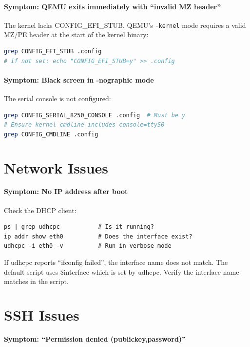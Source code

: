 \paragraph{Symptom: QEMU exits immediately with ``invalid MZ header''}

The kernel lacks CONFIG\_EFI\_STUB. QEMU's \texttt{-kernel} mode requires
a valid MZ/PE header at the start of the kernel binary:

\begin{lstlisting}[language=bash]
grep CONFIG_EFI_STUB .config
# If not set: echo "CONFIG_EFI_STUB=y" >> .config
\end{lstlisting}

\paragraph{Symptom: Black screen in -nographic mode}

The serial console is not configured:

\begin{lstlisting}[language=bash]
grep CONFIG_SERIAL_8250_CONSOLE .config  # Must be y
# Ensure kernel cmdline includes console=ttyS0
grep CONFIG_CMDLINE .config
\end{lstlisting}

\section{Network Issues}

\paragraph{Symptom: No IP address after boot}

Check the DHCP client:
\begin{lstlisting}
ps | grep udhcpc           # Is it running?
ip addr show eth0          # Does the interface exist?
udhcpc -i eth0 -v          # Run in verbose mode
\end{lstlisting}

If udhcpc reports ``ifconfig failed'', the interface name does not match.
The default script uses \$interface which is set by udhcpc. Verify the
interface name matches in the script.

\section{SSH Issues}

\paragraph{Symptom: ``Permission denied (publickey,password)''}

